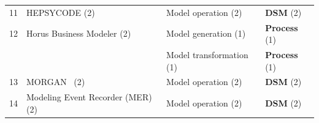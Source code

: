 \begin{tabular} { p{} p{} p{} p{} }
11& HEPSYCODE (2) & \cellcolor[HTML]{CFEFF4}Model operation (2) & \textbf{DSM} (2) \cite{ \paperfiftyfirst,\paperonehundredfortyninth }\\ 
\rowcolor{gray!15} 
12& Horus Business Modeler (2) & \cellcolor[HTML]{D1F1E3}Model generation (1) & \textbf{Process} (1) \cite{ \paperonehundredfiftyeighth }\\ 
 &  & \cellcolor[HTML]{F9E3F8}Model transformation (1) & \textbf{Process} (1) \cite{ \paperonehundredfiftyfirst }\\ 
\rowcolor{gray!15} 
13& MORGAN~\cite{di2023morgan} (2) & \cellcolor[HTML]{CFEFF4}Model operation (2) & \textbf{DSM} (2) \cite{ \paperfiftyfirst,\paperonehundredfortyninth }\\ 
14& Modeling Event Recorder (MER)~\cite{dehghani2023towards} (2) & \cellcolor[HTML]{CFEFF4}Model operation (2) & \textbf{DSM} (2) \cite{ \paperfiftyfirst,\paperonehundredfortyninth }\\ 
\bottomrule 
\end{tabular} 
